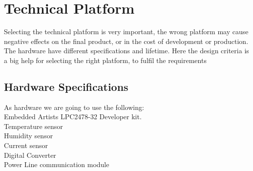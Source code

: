 \section{Technical Platform}
Selecting the technical platform is very important, the wrong platform may cause negative effects on the final product, or in the cost of development or production. The hardware have different specifications and lifetime. Here the design criteria is a big help for selecting the right platform, to fulfil the requirements
\subsection{Hardware Specifications}
As hardware we are going to use the following: 
\\Embedded Artists LPC2478-32 Developer kit.
\\Temperature sensor
\\Humidity sensor
\\Current sensor
\\Digital Converter
\\Power Line communication module

